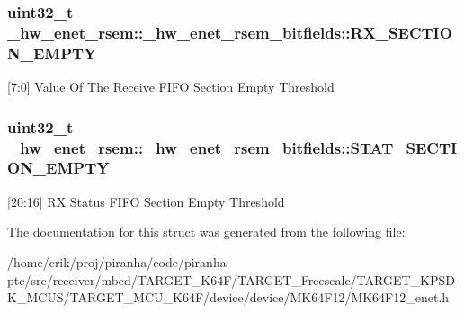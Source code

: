 \subsubsection[{\texorpdfstring{R\+X\+\_\+\+S\+E\+C\+T\+I\+O\+N\+\_\+\+E\+M\+P\+TY}{RX_SECTION_EMPTY}}]{\setlength{\rightskip}{0pt plus 5cm}uint32\+\_\+t \+\_\+hw\+\_\+enet\+\_\+rsem\+::\+\_\+hw\+\_\+enet\+\_\+rsem\+\_\+bitfields\+::\+R\+X\+\_\+\+S\+E\+C\+T\+I\+O\+N\+\_\+\+E\+M\+P\+TY}\hypertarget{struct__hw__enet__rsem_1_1__hw__enet__rsem__bitfields_ae11f97bfea1349d009b05a2cb6ef580b}{}\label{struct__hw__enet__rsem_1_1__hw__enet__rsem__bitfields_ae11f97bfea1349d009b05a2cb6ef580b}
\mbox{[}7\+:0\mbox{]} Value Of The Receive F\+I\+FO Section Empty Threshold 
\subsubsection[{\texorpdfstring{S\+T\+A\+T\+\_\+\+S\+E\+C\+T\+I\+O\+N\+\_\+\+E\+M\+P\+TY}{STAT_SECTION_EMPTY}}]{\setlength{\rightskip}{0pt plus 5cm}uint32\+\_\+t \+\_\+hw\+\_\+enet\+\_\+rsem\+::\+\_\+hw\+\_\+enet\+\_\+rsem\+\_\+bitfields\+::\+S\+T\+A\+T\+\_\+\+S\+E\+C\+T\+I\+O\+N\+\_\+\+E\+M\+P\+TY}\hypertarget{struct__hw__enet__rsem_1_1__hw__enet__rsem__bitfields_a710a6b6e54bf080736d5da075589df0a}{}\label{struct__hw__enet__rsem_1_1__hw__enet__rsem__bitfields_a710a6b6e54bf080736d5da075589df0a}
\mbox{[}20\+:16\mbox{]} RX Status F\+I\+FO Section Empty Threshold 

The documentation for this struct was generated from the following file\+:\begin{DoxyCompactItemize}
\item 
/home/erik/proj/piranha/code/piranha-\/ptc/src/receiver/mbed/\+T\+A\+R\+G\+E\+T\+\_\+\+K64\+F/\+T\+A\+R\+G\+E\+T\+\_\+\+Freescale/\+T\+A\+R\+G\+E\+T\+\_\+\+K\+P\+S\+D\+K\+\_\+\+M\+C\+U\+S/\+T\+A\+R\+G\+E\+T\+\_\+\+M\+C\+U\+\_\+\+K64\+F/device/device/\+M\+K64\+F12/M\+K64\+F12\+\_\+enet.\+h\end{DoxyCompactItemize}
